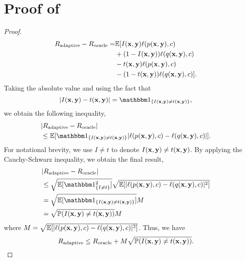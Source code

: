 \clearpage
\appendix
\label{sec:appendix}


\section{\texorpdfstring{Proof of~}{Proof Theorem 3.1}}
\label{app:proof}
\begin{proof}
\begin{align*}
    R_\text{adaptive} - R_\text{oracle} = &\mathbb{E}[I({\mathbf{x}},{\mathbf{y}})\ell(p({\mathbf{x}},{\mathbf{y}}),c) \\
    &+ (1-I({\mathbf{x}},{\mathbf{y}}))\ell(q({\mathbf{x}},{\mathbf{y}}),c) \\
    &- t({\mathbf{x}},{\mathbf{y}})\ell(p({\mathbf{x}},{\mathbf{y}}),c) \\
    & - (1-t({\mathbf{x}},{\mathbf{y}}))\ell(q({\mathbf{x}},{\mathbf{y}}),c)].
\end{align*}
Taking the absolute value and using the fact that
\begin{equation*}
    \lvert I(\rvx,\rvy) -t(\rvx,\rvy)\rvert = \one_{\{ I(\rvx,\rvy) \neq t(\rvx,\rvy)\}},
\end{equation*}
we obtain the following inequality,
\begin{align*}
    &\lvert R_\text{adaptive} - R_\text{oracle} \rvert \\
    &\leq \mathbb{E}[
    \one_{\{I(\rvx,\rvy) \neq t(\rvx,\rvy) \}} \lvert \ell(p(\rvx,\rvy),c) - \ell(q(\rvx,\rvy),c)\rvert
    ].
\end{align*}
For notational brevity, we use $I\neq t$ to denote $I({\mathbf{x}},{\mathbf{y}})\neq t({\mathbf{x}},{\mathbf{y}})$. By applying the Cauchy-Schwarz inequality, we obtain the final result,
\begin{align*}
    &\lvert R_\text{adaptive} - R_\text{oracle} \rvert \\&\leq \sqrt{\mathbb{E}[
    \one^2_{\{I \neq t \}}]} \sqrt{\mathbb{E}[ \lvert \ell(p(\rvx,\rvy),c) - \ell(q(\rvx,\rvy),c)\rvert^2 
    ]} \\
    &= \sqrt{\mathbb{E}[\one_{\{I(\rvx,\rvy) \neq t(\rvx,\rvy)\}}]} M\\
    &= \sqrt{\mathbb{P}(I(\rvx,\rvy)\neq t(\rvx,\rvy))} M
\end{align*}
where $M=\sqrt{\mathbb{E}[ \lvert \ell(p({\mathbf{x}},{\mathbf{y}}),c) - \ell(q({\mathbf{x}},{\mathbf{y}}),c)\rvert^2 
    ]}$. Thus, we have
\begin{equation*}
    R_\text{adaptive} \leq R_\text{oracle} + M \sqrt{\mathbb{P}(I({\mathbf{x}},{\mathbf{y}}) \neq t({\mathbf{x}},{\mathbf{y}}))}.
\end{equation*}

\end{proof}


